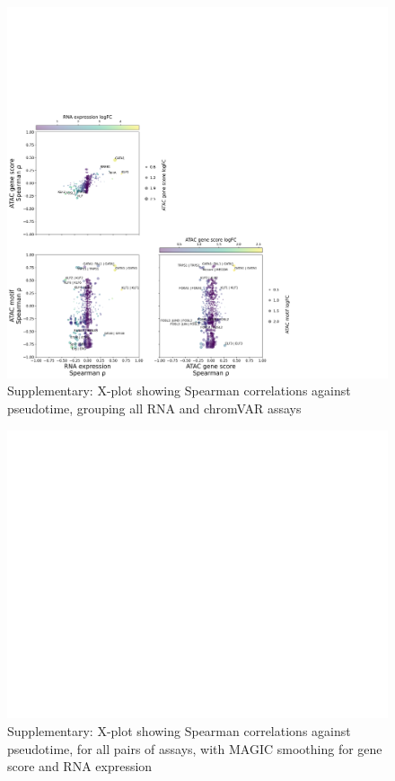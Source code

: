 \documentclass[a4paper]{article}
\begin{document}
\begin{figure}[!htb]
  \centering
  \includegraphics[width=\textwidth]{../figures/hematopoiesis/Erythroid_40_103_smooth_none_grouped_X_plot.png}
  \caption{Supplementary: X-plot showing Spearman correlations against pseudotime, grouping all RNA and chromVAR assays}
\end{figure}


\begin{figure}[!htb]
  \centering
  \includegraphics[width=\textwidth]{../figures/hematopoiesis/Erythroid_40_103_smooth_magic_detailed_X_plot.png}
  \caption{Supplementary: X-plot showing Spearman correlations against pseudotime, for all pairs of assays, with MAGIC smoothing for gene score and RNA expression}
\end{figure}
\end{document}
